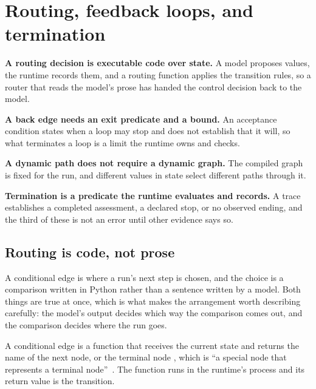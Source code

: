 \section{Routing, feedback loops, and termination}
\label{sec:control}

\begin{upshot}
\item \textbf{A routing decision is executable code over state.} A model proposes values, the
  runtime records them, and a routing function applies the transition rules, so a router that reads
  the model's prose has handed the control decision back to the model.
\item \textbf{A back edge needs an exit predicate and a bound.} An acceptance condition states when
  a loop may stop and does not establish that it will, so what terminates a loop is a limit the
  runtime owns and checks.
\item \textbf{A dynamic path does not require a dynamic graph.} The compiled graph is fixed for the
  run, and different values in state select different paths through it.
\item \textbf{Termination is a predicate the runtime evaluates and records.} A trace establishes a
  completed assessment, a declared stop, or no observed ending, and the third of these is not an
  error until other evidence says so.
\end{upshot}

\subsection{Routing is code, not prose}
\label{sec:control-routing}

A conditional edge is where a run's next step is chosen, and the choice is a comparison written in
Python rather than a sentence written by a model. Both things are true at once, which is what makes
the arrangement worth describing carefully: the model's output decides which way the comparison
comes out, and the comparison decides where the run goes.

\begin{definition}
\label{def:conditional-edge}
A conditional edge is a function that receives the current state and returns the name of the next
node, or the terminal node , which is ``a special node that represents a terminal
node''~\citep{langgraph-graph-api}. The function runs in the runtime's process and its return value
is the transition.
\end{definition}

